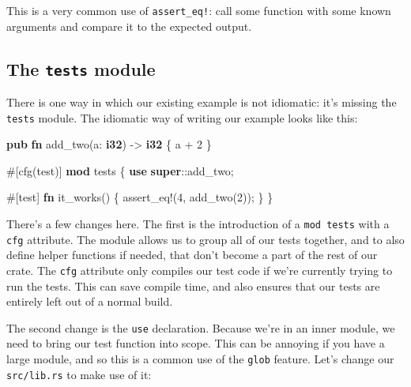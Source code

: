 \documentclass[a4paper,]{book}
\newenvironment{Shaded}{\begin{snugshade}}{\end{snugshade}}
\newcommand{\KeywordTok}[1]{\textcolor[rgb]{0.13,0.29,0.53}{\textbf{{#1}}}}
\newcommand{\DecValTok}[1]{\textcolor[rgb]{0.00,0.00,0.81}{{#1}}}
\newcommand{\OtherTok}[1]{\textcolor[rgb]{0.56,0.35,0.01}{{#1}}}
\newcommand{\NormalTok}[1]{{#1}}
\begin{document}
This is a very common use of \texttt{assert\_eq!}: call some function
with some known arguments and compare it to the expected output.

\subsection{\texorpdfstring{The \texttt{tests}
module}{The tests module}}\label{the-tests-module}

There is one way in which our existing example is not idiomatic: it's
missing the \texttt{tests} module. The idiomatic way of writing our
example looks like this:

\begin{Shaded}
\begin{Highlighting}[]
\KeywordTok{pub} \KeywordTok{fn} \NormalTok{add_two(a: }\KeywordTok{i32}\NormalTok{) -> }\KeywordTok{i32} \NormalTok{\{}
    \NormalTok{a + }\DecValTok{2}
\NormalTok{\}}

\OtherTok{#[}\NormalTok{cfg}\OtherTok{(}\NormalTok{test}\OtherTok{)]}
\KeywordTok{mod} \NormalTok{tests \{}
    \KeywordTok{use} \KeywordTok{super}\NormalTok{::add_two;}

    \OtherTok{#[}\NormalTok{test}\OtherTok{]}
    \KeywordTok{fn} \NormalTok{it_works() \{}
        \OtherTok{assert_eq!}\NormalTok{(}\DecValTok{4}\NormalTok{, add_two(}\DecValTok{2}\NormalTok{));}
    \NormalTok{\}}
\NormalTok{\}}
\end{Highlighting}
\end{Shaded}

There's a few changes here. The first is the introduction of a
\texttt{mod\ tests} with a \texttt{cfg} attribute. The module allows us
to group all of our tests together, and to also define helper functions
if needed, that don't become a part of the rest of our crate. The
\texttt{cfg} attribute only compiles our test code if we're currently
trying to run the tests. This can save compile time, and also ensures
that our tests are entirely left out of a normal build.

The second change is the \texttt{use} declaration. Because we're in an
inner module, we need to bring our test function into scope. This can be
annoying if you have a large module, and so this is a common use of the
\texttt{glob} feature. Let's change our \texttt{src/lib.rs} to make use
of it:
\end{document}
